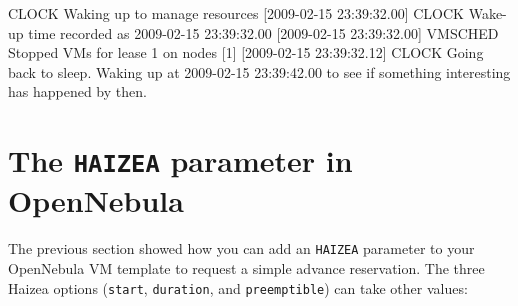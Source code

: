 \begin{wideshellverbatim}
[2009-02-15 23:39:32.00] CLOCK   Waking up to manage resources
[2009-02-15 23:39:32.00] CLOCK   Wake-up time recorded as 2009-02-15 23:39:32.00
[2009-02-15 23:39:32.00] VMSCHED Stopped VMs for lease 1 on nodes [1]
[2009-02-15 23:39:32.12] CLOCK   Going back to sleep. 
                                 Waking up at 2009-02-15 23:39:42.00 
                                 to see if something interesting has happened by then.
\end{wideshellverbatim}

\section{The \texttt{HAIZEA} parameter in OpenNebula}

The previous section showed how you can add an \texttt{HAIZEA} parameter to your OpenNebula VM template to request a simple advance reservation. The three Haizea options (\texttt{start}, \texttt{duration}, and \texttt{preemptible}) can take other values:

